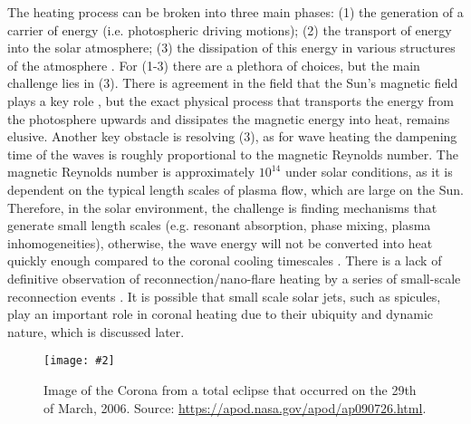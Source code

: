 \documentclass[12pt]{ociamthesis}
\newcommand{\mfig}[4]{
  \begin{figure}
  \begin{center}
  \texttt{[image: \#2]}
  \caption{#3}
  \label{#4}
  \end{center}
  \end{figure}}
\begin{document}
%
The heating process can be broken into three main phases: (1) the generation of a carrier of energy (i.e. photospheric driving motions); (2) the transport of energy into the solar atmosphere; (3) the dissipation of this energy in various structures of the atmosphere \citep{Wentzel1974SoPh39129W, Robert2004AG45d34E}. For (1-3) there are a plethora of choices, but the main challenge lies in (3). There is agreement in the field that the Sun's magnetic field plays a key role \citep{Parnell2012RSPTA3703217P, Arregui2015RSPTA37340261A}, but the exact physical process that transports the energy from the photosphere upwards and dissipates the magnetic energy into heat, remains elusive. Another key obstacle is resolving (3), as for wave heating the dampening time of the waves is roughly proportional to the magnetic Reynolds number. The magnetic Reynolds number is approximately  $10^{14}$ under solar conditions, as it is dependent on the typical length scales of plasma flow, which are large on the Sun. Therefore, in the solar environment, the challenge is finding mechanisms that generate small length scales (e.g. resonant absorption, phase mixing, plasma inhomogeneities), otherwise, the wave energy will not be converted into heat quickly enough compared to the coronal cooling timescales \citep{Doorsselaere2020SSRv216140V}. There is a lack of definitive observation of reconnection/nano-flare heating by a series of small-scale reconnection events \citep{Parnell2012RSPTA3703217P}. It is possible that small scale solar jets, such as spicules, play an important role in coronal heating due to their ubiquity and dynamic nature, which is discussed later.
\mfig{0.65}{figures/corona_vangorp.png}{Image of the Corona from a total eclipse that occurred on the 29th of March, 2006. Source: \url{https://apod.nasa.gov/apod/ap090726.html}.}{corona_image}
\end{document}
